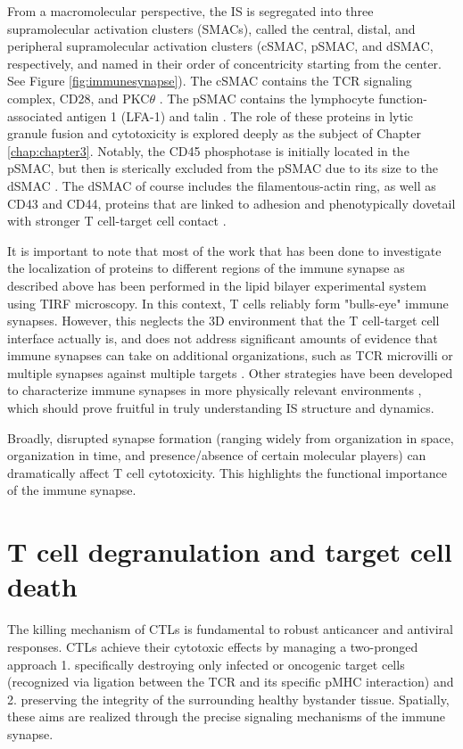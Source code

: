 From a macromolecular perspective, the IS is segregated into three supramolecular activation clusters (SMACs), called the central, distal, and peripheral supramolecular activation clusters (cSMAC, pSMAC, and dSMAC, respectively, and named in their order of concentricity starting from the center. See Figure \ref{fig:immunesynapse}). The cSMAC contains the TCR signaling complex, CD28, and PKC$\theta$ \cite{Monks1998, Tseng2008}. The pSMAC contains the lymphocyte function-associated antigen 1 (LFA-1) and talin \cite{Monks1998}. The role of these proteins in lytic granule fusion and cytotoxicity is explored deeply as the subject of Chapter \ref{chap:chapter3}. Notably, the CD45 phosphotase is initially located in the pSMAC, but then is sterically excluded from the pSMAC due to its size to the dSMAC \cite{Johnson2000}. The dSMAC of course includes the filamentous-actin ring, as well as CD43 and CD44, proteins that are linked to adhesion and phenotypically dovetail with stronger T cell-target cell contact \cite{Yu2013}.

It is important to note that most of the work that has been done to investigate the localization of proteins to different regions of the immune synapse as described above has been performed in the lipid bilayer experimental system using TIRF microscopy. In this context, T cells reliably form "bulls-eye" immune synapses. However, this neglects the 3D environment that the T cell-target cell interface actually is, and does not address significant amounts of evidence that immune synapses can take on additional organizations, such as TCR microvilli \cite{Kim2018} or multiple synapses against multiple targets \cite{Vorselen2020}. Other strategies have been developed to characterize immune synapses in more physically relevant environments  \cite{Jin2019}, which should prove fruitful in truly understanding IS structure and dynamics.

Broadly, disrupted synapse formation (ranging widely from organization in space, organization in time, and presence/absence of certain molecular players) can dramatically affect T cell cytotoxicity. This highlights the functional importance of the immune synapse.

\section{T cell degranulation and target cell death}
\label{T cell degranulation and target cell death}
The killing mechanism of CTLs is fundamental to robust anticancer and antiviral responses.  CTLs achieve their cytotoxic effects by managing a two-pronged approach 1. specifically destroying only infected or oncogenic target cells (recognized via ligation between the TCR and its specific pMHC interaction) and 2. preserving the integrity of the surrounding healthy bystander tissue. Spatially, these aims are realized through the precise signaling  mechanisms of the immune synapse.

